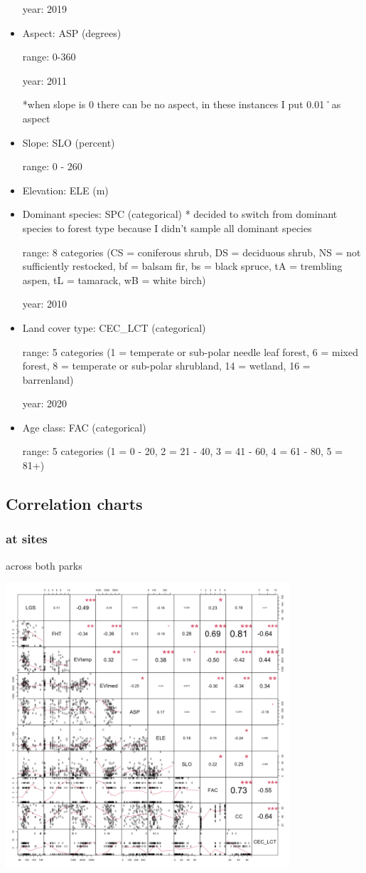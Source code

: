 \documentclass[
  letterpaper,
  DIV=11,
  numbers=noendperiod]{scrartcl}
\begin{document}
\begin{itemize}
  year: 2019
\item
  Aspect: ASP (degrees)

  range: 0-360

  year: 2011

  *when slope is 0 there can be no aspect, in these instances I put
  0.01˚as aspect
\item
  Slope: SLO (percent)

  range: 0 - 260
\item
  Elevation: ELE (m)
\item
  Dominant species: SPC (categorical) * decided to switch from dominant
  species to forest type because I didn't sample all dominant species

  range: 8 categories (CS = coniferous shrub, DS = deciduous shrub, NS =
  not sufficiently restocked, bf = balsam fir, bs = black spruce, tA =
  trembling aspen, tL = tamarack, wB = white birch)

  year: 2010
\item
  Land cover type: CEC\_LCT (categorical)

  range: 5 categories (1 = temperate or sub-polar needle leaf forest, 6
  = mixed forest, 8 = temperate or sub-polar shrubland, 14 = wetland, 16
  = barrenland)

  year: 2020
\item
  Age class: FAC (categorical)

  range: 5 categories (1 = 0 - 20, 2 = 21 - 40, 3 = 41 - 60, 4 = 61 -
  80, 5 = 81+)
\end{itemize}

\hypertarget{correlation-charts}{%
\subsection{Correlation charts}\label{correlation-charts}}

\hypertarget{at-sites}{%
\subsubsection{at sites}\label{at-sites}}

across both parks

\includegraphics[width=4.16667in,height=\textheight]{correlation plots/chart_site_both.png}
\end{document}
